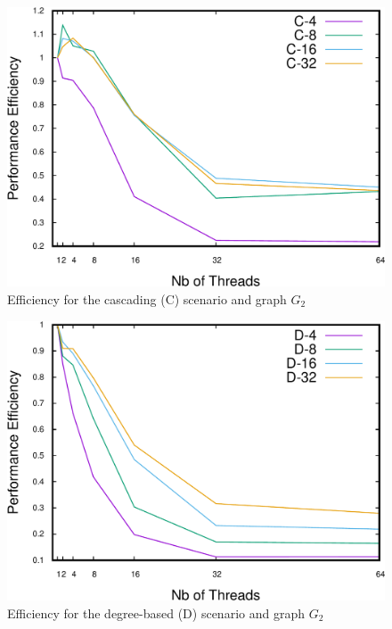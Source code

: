 \begin{figure}
\centering
\includegraphics[scale=0.35]{bench/generated/efficiency-c-2-crop.pdf}
\caption{Efficiency for the cascading (C) scenario and graph $G_2$}
\label{fig:effc2}
\end{figure}

\begin{figure}
\centering
\includegraphics[scale=0.35]{bench/generated/efficiency-d-2-crop.pdf}
\caption{Efficiency for the degree-based (D) scenario and graph $G_2$}
\label{fig:effd2}
\end{figure}


